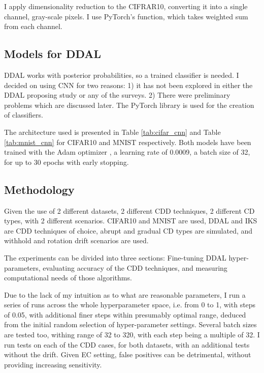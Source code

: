 \documentclass[a4paper]{article}
\begin{document}
I apply dimensionality reduction to the CIFRAR10, converting it into a single channel, gray-scale pixels. I use PyTorch's function, which takes weighted sum from each channel.  

\subsection{Models for DDAL}

DDAL works with posterior probabilities, so a trained classifier is needed. I decided on using CNN for two reasons: 1) it has not been explored in either the DDAL proposing study or any of the surveys. 2) There were preliminary problems which are discussed later. The PyTorch library is used for the creation of classifiers.

The architecture used is presented in Table \ref{tab:cifar_cnn} and Table \ref{tab:mnist_cnn} for CIFAR10 \cite{noauthor_cifar-10_nodate} and MNIST respectively. Both models have been trained with the Adam optimizer \cite{noauthor_adam_nodate}, a learning rate of 0.0009, a batch size of 32, for up to 30 epochs with early stopping.

\subsection{Methodology}

Given the use of 2 different datasets, 2 different CDD techniques, 2 different CD types, with 2 different scenarios. CIFAR10 and MNIST are used, DDAL and IKS are CDD techniques of choice, abrupt and gradual CD types are simulated, and withhold and rotation drift scenarios are used.

The experiments can be divided into three sections: Fine-tuning DDAL hyper-parameters, evaluating accuracy of the CDD techniques, and measuring computational needs of those algorithms. 

Due to the lack of my intuition as to what are reasonable parameters, I run a series of runs across 
the whole hyperparameter space, i.e. from 0 to 1, with steps of 0.05, with additional finer steps within presumably optimal range, deduced from the initial random selection of hyper-parameter settings. Several batch sizes are tested too, withing range of 32 to 320, with each step being a multiple of 32. I run tests on each of the CDD cases, for both datasets, with an additional tests without the drift. Given EC setting, false positives can be detrimental, without providing increasing sensitivity. 
\end{document}

